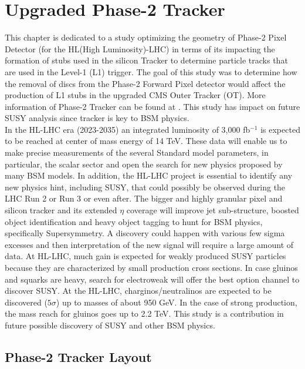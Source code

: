 \section{Upgraded Phase-2 Tracker}

This chapter is dedicated to a study optimizing the geometry of Phase-2 \cite{Phase2Tracker} Pixel Detector (for the HL(High Luminosity)-LHC) in terms of its impacting the formation of stubs used in the silicon Tracker to determine particle tracks that are used in the Level-1 (L1) trigger. The goal of this study was to determine how the removal of discs from the Phase-2 Forward Pixel detector would affect the production of L1 stubs in the upgraded CMS Outer Tracker (OT). More information of Phase-2 Tracker can be found at \cite{Phase2Tracker1}. This study has impact on future SUSY analysis since tracker is key to BSM physics.\\

In the HL-LHC era (2023-2035) an integrated luminosity of 3,000 fb$^{-1}$ is expected to be reached at center of mass energy of 14 TeV. These data will enable us to make precise measurements of the several Standard model parameters, in particular, the scalar sector and open the search for new physics proposed by many BSM models. In addition, the HL-LHC project is essential to identify any new physics hint, including SUSY, that could possibly be observed during the LHC Run 2 or Run 3 or even after. The bigger and highly granular pixel and silicon tracker and its extended $\eta$ coverage will improve jet sub-structure, boosted object identification and heavy object tagging to hunt for BSM physics, specifically Supersymmetry. A discovery could happen with various few sigma excesses and then interpretation of the new signal will require a large amount of data. At HL-LHC, much gain is expected for weakly produced SUSY particles because they are characterized by small production cross sections. In case gluinos and squarks are heavy, search for electroweak will offer the best option channel to discover SUSY. At the HL-LHC, charginos/neutralinos are expected to be discovered ($5\sigma$) up to masses of about 950 GeV. In the case of strong production, the mass reach for gluinos goes up to 2.2 TeV. This study is a contribution in future possible discovery of SUSY and other BSM physics.

\subsection{Phase-2 Tracker Layout}

